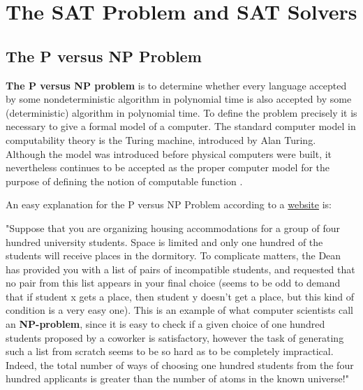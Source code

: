 \documentclass[12pt]{book}
\begin{document}
\chapter{The SAT Problem and SAT Solvers}
\label{cha:SAT Problem and SAT Solvers}
\section{The P versus NP Problem}
\label{sec:The P versus NP Problem}

\begin{defi}\label{def:np} 
      \textbf{The P versus NP problem} is to determine whether every language accepted by some nondeterministic algorithm in polynomial time is also accepted by some
      (deterministic) algorithm in polynomial time. To define the problem precisely it is necessary to give a formal model of a computer.
      The standard computer model in computability theory is the Turing machine, introduced by Alan Turing. Although the model was introduced before physical computers were built, it
      nevertheless continues to be accepted as the proper computer model for the purpose of defining the notion of computable function \cite{h4}.
\end{defi} 
An easy explanation for the P versus NP Problem according to a \href{http://www.claymath.org/prizeproblems/pvsnp.htm}{website} is:

"Suppose that you are organizing housing accommodations for a group of four hundred university students. Space is limited and only one hundred of the students will receive places in the dormitory. 
To complicate matters, the Dean has provided you with a list of pairs of incompatible students, and requested that no pair from this list appears in your final choice (seems to be odd to demand 
that if student x gets a place, then student y doesn’t get a place, but this kind of condition is a very easy one). This is an example of what computer scientists call an \textbf{NP-problem}, 
since it is easy to check if a given choice of one hundred students proposed by a coworker is satisfactory, however the task of generating such a list from scratch seems to be so hard as to be 
completely impractical. Indeed, the total number of ways of choosing one hundred students from the four hundred applicants is greater than the number of atoms in the known universe!"
\end{document}
